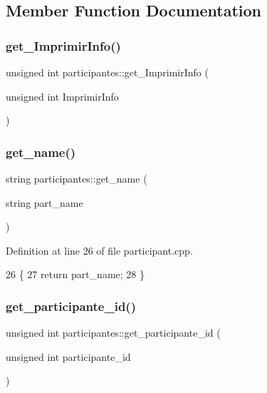 \subsection{Member Function Documentation}
\mbox{\label{classparticipantes_a641f0127662b2b17e193d3b24b18a35e}} 
\subsubsection{\texorpdfstring{get\+\_\+\+Imprimir\+Info()}{get\_ImprimirInfo()}}
{\footnotesize\ttfamily unsigned int participantes\+::get\+\_\+\+Imprimir\+Info (\begin{DoxyParamCaption}\item[{unsigned int}]{Imprimir\+Info }\end{DoxyParamCaption})}

\mbox{\label{classparticipantes_adb2548c80ef57db146570148a810d875}} 
\subsubsection{\texorpdfstring{get\+\_\+name()}{get\_name()}}
{\footnotesize\ttfamily string participantes\+::get\+\_\+name (\begin{DoxyParamCaption}\item[{string}]{part\+\_\+name }\end{DoxyParamCaption})}



Definition at line 26 of file participant.\+cpp.


\begin{DoxyCode}
26                                                 \{
27     \textcolor{keywordflow}{return} part\_name;
28 \}
\end{DoxyCode}
\mbox{\label{classparticipantes_a643de8965fc3b97be17befdc983be5b4}} 
\subsubsection{\texorpdfstring{get\+\_\+participante\+\_\+id()}{get\_participante\_id()}}
{\footnotesize\ttfamily unsigned int participantes\+::get\+\_\+participante\+\_\+id (\begin{DoxyParamCaption}\item[{unsigned int}]{participante\+\_\+id }\end{DoxyParamCaption})}



